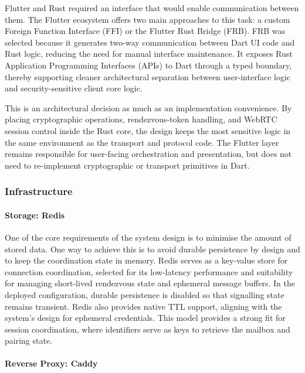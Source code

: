 \documentclass[12pt,a4paper]{article}
\begin{document}
Flutter and Rust required an interface that would enable communication between them. The Flutter ecosystem offers two main approaches to this task: a custom Foreign Function Interface (FFI) or the Flutter Rust Bridge (FRB). FRB was selected because it generates two-way communication between Dart UI code and Rust logic, reducing the need for manual interface maintenance. It exposes Rust Application Programming Interfaces (APIs) to Dart through a typed boundary, thereby supporting cleaner architectural separation between user-interface logic and security-sensitive client core logic.

This is an architectural decision as much as an implementation convenience. By placing cryptographic operations, rendezvous-token handling, and WebRTC session control inside the Rust core, the design keeps the most sensitive logic in the same environment as the transport and protocol code. The Flutter layer remains responsible for user-facing orchestration and presentation, but does not need to re-implement cryptographic or transport primitives in Dart.

\subsubsection{Infrastructure}

\paragraph{Storage: Redis}

One of the core requirements of the system design is to minimise the amount of stored data. One way to achieve this is to avoid durable persistence by design and to keep the coordination state in memory. Redis serves as a key-value store for connection coordination, selected for its low-latency performance and suitability for managing short-lived rendezvous state and ephemeral message buffers. In the deployed configuration, durable persistence is disabled so that signalling state remains transient. Redis also provides native TTL support, aligning with the system’s design for ephemeral credentials. This model provides a strong fit for session coordination, where identifiers serve as keys to retrieve the mailbox and pairing state.

\paragraph{Reverse Proxy: Caddy}
\end{document}
